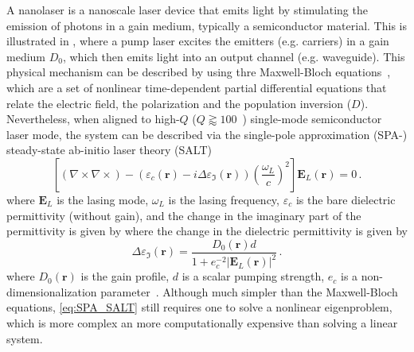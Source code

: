 A nanolaser is a nanoscale laser device that emits light by stimulating the emission of photons in a gain medium, typically a semiconductor material. This is illustrated
in , where a pump laser excites the emitters (e.g. carriers) in a gain medium $D_0$, which then emits light into an output channel (e.g. waveguide). This physical
mechanism can be described by using thre Maxwell-Bloch equations~\cite{haken_laser_dynamics, PhysRev.134.A1429, SALT_original}, which are a set of nonlinear time-dependent 
partial differential equations that relate the electric field, the polarization and the population inversion ($D$). Nevertheless, when aligned to high-$Q$ ($Q\gtrapprox 100$~\cite{cerjan_2016}) single-mode semiconductor laser
mode, the system can be described via the single-pole approximation (SPA-) steady-state ab-initio laser theory (SALT)~\cite{Ge_2010}
\begin{equation}\label{eq:SPA_SALT}
    {\left[(\nabla \times 
     \nabla \times ) -\left(\varepsilon_c(\mathbf{r})-i \Delta \varepsilon_\Im (\mathbf{r})\right) \left(\frac{\omega_L}{c}\right)^2\right] \mathbf{E}_L(\mathbf{r})=0}\,.
\end{equation}
where $\mathbf{E}_L$ is the lasing mode, $\omega_L$ is the lasing frequency, $\varepsilon_c$ is the bare dielectric permittivity (without gain), and the change in the 
imaginary part of the permittivity is given by
where the change in the dielectric permittivity is given by
\begin{equation}\label{eq:gain_SALT}
        \Delta \varepsilon_\Im (\mathbf{r}) =  \frac{D_0(\mathbf{r}) d}{1+ e_c^{-2}\left|\mathbf{E}_L(\mathbf{r})\right|^2}\,.
\end{equation}
where $D_0(\mathbf{r})$ is the gain profile, $d$ is a scalar pumping strength, $e_c$ is a non-dimensionalization parameter~\cite{Ge_2010}. Although much simpler than the Maxwell-Bloch equations, \eqref{eq:SPA_SALT} still
requires one to solve a nonlinear eigenproblem, which is more complex an more computationally expensive than solving a linear system.

